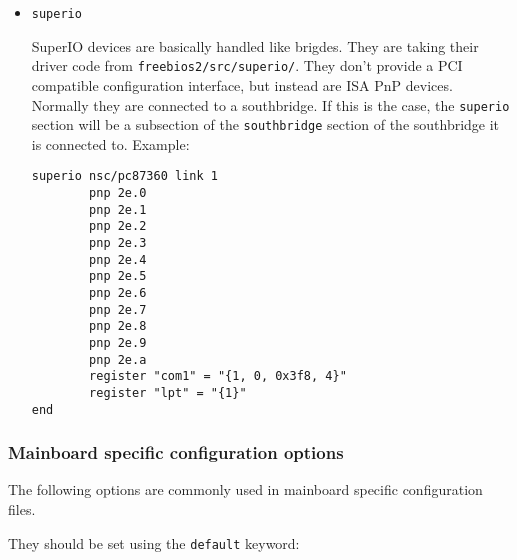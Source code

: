 \documentclass[titlepage,12pt]{article}
\begin{document}
\begin{itemize}
\item \begin{verbatim}superio\end{verbatim}

SuperIO devices are basically handled like brigdes. They are taking
their driver code from \texttt{freebios2/src/superio/}. They don't
provide a PCI compatible configuration interface, but instead are ISA
PnP devices. Normally they are connected to a southbridge. If this is
the case, the \texttt{superio} section will be a subsection of the
\texttt{southbridge} section of the southbridge it is connected to.
Example:

\begin{verbatim}
superio nsc/pc87360 link 1
        pnp 2e.0
        pnp 2e.1
        pnp 2e.2
        pnp 2e.3
        pnp 2e.4
        pnp 2e.5
        pnp 2e.6
        pnp 2e.7
        pnp 2e.8
        pnp 2e.9
        pnp 2e.a
        register "com1" = "{1, 0, 0x3f8, 4}"
        register "lpt" = "{1}"
end
\end{verbatim}

\end{itemize}

\newpage

\subsubsection{Mainboard specific configuration options}

The following options are commonly used in mainboard specific
configuration files.

They should be set using the \texttt{default} keyword:
\end{document}
